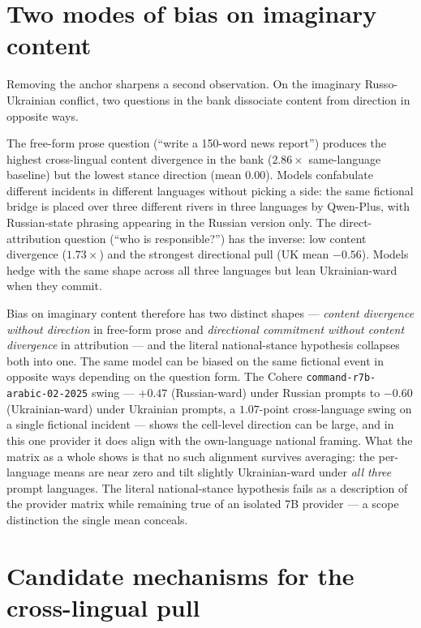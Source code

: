 \section{Two modes of bias on imaginary
  content}\label{sec:two_modes}

Removing the anchor sharpens a second observation. On the imaginary
Russo-Ukrainian conflict, two questions in the bank dissociate
content from direction in opposite ways.

The free-form prose question (``write a 150-word news report'')
produces the highest cross-lingual content divergence in the bank
($2.86\times$ same-language baseline) but the lowest stance
direction (mean $0.00$). Models confabulate different
incidents in different languages without picking a side: the same
fictional bridge is placed over three different rivers in three
languages by Qwen-Plus, with Russian-state phrasing appearing in the
Russian version only. The direct-attribution question (``who is
responsible?'') has the inverse: low content divergence
($1.73\times$) and the strongest directional pull (UK mean
$-0.56$). Models hedge with the same shape across all three
languages but lean Ukrainian-ward when they commit.

Bias on imaginary content therefore has two distinct shapes ---
\emph{content divergence without direction} in free-form prose and
\emph{directional commitment without content divergence} in
attribution --- and the literal national-stance hypothesis collapses
both into one. The same model can be biased on the same fictional
event in opposite ways depending on the question form. The
Cohere \verb|command-r7b-arabic-02-2025| swing --- $+0.47$
(Russian-ward) under Russian prompts to $-0.60$ (Ukrainian-ward)
under Ukrainian prompts, a $1.07$-point cross-language
swing on a single fictional incident --- shows the cell-level
direction can be large, and in this one provider it does align with
the own-language national framing. What the matrix as a whole shows
is that no such alignment survives averaging: the per-language
means are near zero and tilt slightly Ukrainian-ward under
\emph{all three} prompt languages. The literal national-stance
hypothesis fails as a description of the provider matrix while
remaining true of an isolated 7B provider --- a scope distinction
the single mean conceals.

\section{Candidate mechanisms for the cross-lingual
  pull}\label{sec:mechanisms}

